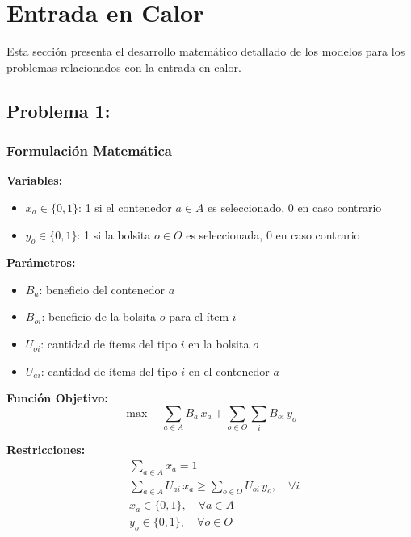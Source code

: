 \documentclass[a4paper,12pt]{article}
\begin{document}
\section{Entrada en Calor}

Esta sección presenta el desarrollo matemático detallado de los modelos para los problemas relacionados con la entrada en calor.

\subsection{Problema 1:}
\label{sec:probl1}

\subsubsection{Formulación Matemática}

\textbf{Variables:}
\begin{itemize}
    \item $x_a \in \{0,1\}$: 1 si el contenedor $a \in A$ es seleccionado, 0 en caso contrario
    \item $y_o \in \{0,1\}$: 1 si la bolsita $o \in O$ es seleccionada, 0 en caso contrario
\end{itemize}

\textbf{Parámetros:}
\begin{itemize}
    \item $B_a$: beneficio del contenedor $a$
    \item $B_{oi}$: beneficio de la bolsita $o$ para el ítem $i$
    \item $U_{oi}$: cantidad de ítems del tipo $i$ en la bolsita $o$
    \item $U_{ai}$: cantidad de ítems del tipo $i$ en el contenedor $a$
\end{itemize}

\textbf{Función Objetivo:}
\begin{equation}
\max \quad \sum_{a \in A} B_a \, x_a + \sum_{o \in O} \sum_{i} B_{oi} \, y_o
\end{equation}

\textbf{Restricciones:}
\begin{align}
& \sum_{a \in A} x_a = 1 \\[6pt]
& \sum_{a \in A} U_{ai} \, x_a \geq \sum_{o \in O} U_{oi} \, y_o, \quad \forall i \\
& x_a \in \{0,1\}, \quad \forall a \in A \\
& y_o \in \{0,1\}, \quad \forall o \in O
\end{align}
\end{document}
